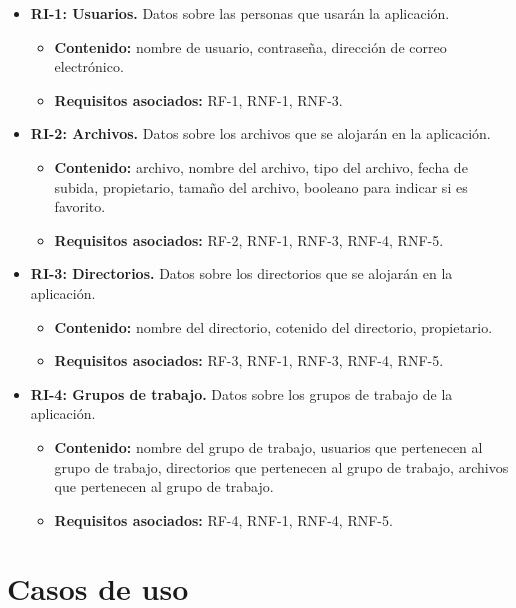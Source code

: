 \begin{itemize}
	\item \textbf{RI-1: Usuarios.} Datos sobre las personas que usarán la aplicación.
	\begin{itemize}
		\item \textbf{Contenido:} nombre de usuario, contraseña, dirección de correo electrónico.
		\item \textbf{Requisitos asociados:} RF-1, RNF-1, RNF-3.
	\end{itemize}
	
	\item \textbf{RI-2: Archivos.} Datos sobre los archivos que se alojarán en la aplicación.
	\begin{itemize}
		\item \textbf{Contenido:} archivo, nombre del archivo, tipo del archivo, fecha de subida, propietario, tamaño del archivo, booleano para indicar si es favorito.
		\item \textbf{Requisitos asociados:} RF-2, RNF-1, RNF-3, RNF-4, RNF-5.
	\end{itemize}
	
	\item \textbf{RI-3: Directorios.} Datos sobre los directorios que se alojarán en la aplicación.
	\begin{itemize}
		\item \textbf{Contenido:} nombre del directorio, cotenido del directorio, propietario.
		\item \textbf{Requisitos asociados:} RF-3, RNF-1, RNF-3, RNF-4, RNF-5.
	\end{itemize}
	
	\item \textbf{RI-4: Grupos de trabajo.} Datos sobre los grupos de trabajo de la aplicación.
	\begin{itemize}
		\item \textbf{Contenido:} nombre del grupo de trabajo, usuarios que pertenecen al grupo de trabajo, directorios que pertenecen al grupo de trabajo, archivos que pertenecen al grupo de trabajo.
		\item \textbf{Requisitos asociados:} RF-4, RNF-1, RNF-4, RNF-5.
	\end{itemize}
\end{itemize}

\section{Casos de uso}
